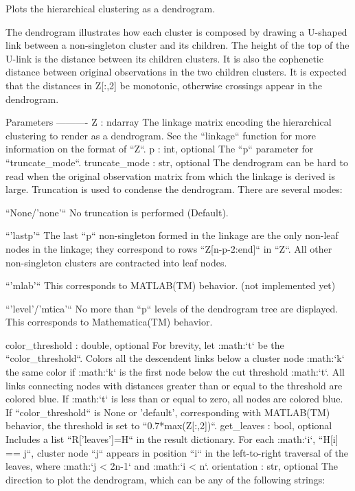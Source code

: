 \begin{DoxyVerb}Plots the hierarchical clustering as a dendrogram.

The dendrogram illustrates how each cluster is
composed by drawing a U-shaped link between a non-singleton
cluster and its children. The height of the top of the U-link is
the distance between its children clusters. It is also the
cophenetic distance between original observations in the two
children clusters. It is expected that the distances in Z[:,2] be
monotonic, otherwise crossings appear in the dendrogram.

Parameters
----------
Z : ndarray
    The linkage matrix encoding the hierarchical clustering to
    render as a dendrogram. See the ``linkage`` function for more
    information on the format of ``Z``.
p : int, optional
    The ``p`` parameter for ``truncate_mode``.
truncate_mode : str, optional
    The dendrogram can be hard to read when the original
    observation matrix from which the linkage is derived is
    large. Truncation is used to condense the dendrogram. There
    are several modes:

    ``None/'none'``
      No truncation is performed (Default).

    ``'lastp'``
      The last ``p`` non-singleton formed in the linkage are the only
      non-leaf nodes in the linkage; they correspond to rows
      ``Z[n-p-2:end]`` in ``Z``. All other non-singleton clusters are
      contracted into leaf nodes.

    ``'mlab'``
      This corresponds to MATLAB(TM) behavior. (not implemented yet)

    ``'level'/'mtica'``
      No more than ``p`` levels of the dendrogram tree are displayed.
      This corresponds to Mathematica(TM) behavior.

color_threshold : double, optional
    For brevity, let :math:`t` be the ``color_threshold``.
    Colors all the descendent links below a cluster node
    :math:`k` the same color if :math:`k` is the first node below
    the cut threshold :math:`t`. All links connecting nodes with
    distances greater than or equal to the threshold are colored
    blue. If :math:`t` is less than or equal to zero, all nodes
    are colored blue. If ``color_threshold`` is None or
    'default', corresponding with MATLAB(TM) behavior, the
    threshold is set to ``0.7*max(Z[:,2])``.
get_leaves : bool, optional
    Includes a list ``R['leaves']=H`` in the result
    dictionary. For each :math:`i`, ``H[i] == j``, cluster node
    ``j`` appears in position ``i`` in the left-to-right traversal
    of the leaves, where :math:`j < 2n-1` and :math:`i < n`.
orientation : str, optional
    The direction to plot the dendrogram, which can be any
    of the following strings:


\end{DoxyVerb}
